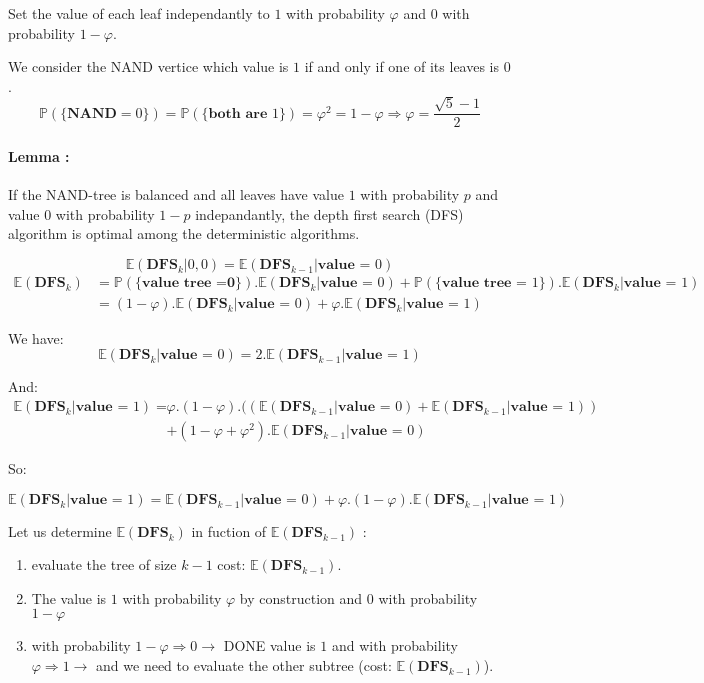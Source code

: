 Set the value of each leaf independantly to $1$ with probability $\varphi$ and $0$ with probability $1-\varphi$.

We consider the NAND vertice which value is $1$ if and only if one of its leaves is $0$.
$$\displaystyle{\mathbb{P}(\{\textbf{NAND}=0\}) = \mathbb{P}(\{\textbf{both are }1\}) = \varphi^{2}=1-\varphi \Rightarrow \varphi = \frac{\sqrt{5}-1}{2}}$$

\paragraph{Lemma :}
If the NAND-tree is balanced and all leaves have value $1$ with probability $p$ and value $0$ with probability $1-p$ indepandantly, the depth first search (DFS) algorithm is optimal among the deterministic algorithms.

$$\mathbb{E}(\textbf{DFS}_{k} | 0,0) = \mathbb{E}(\textbf{DFS}_{k-1}|\textbf{value = }0)$$
$$\begin{array}{cl}\mathbb{E}(\textbf{DFS}_{k}) &= \mathbb{P}(\{\textbf{value tree =0}\}).\mathbb{E}(\textbf{DFS}_{k} | \textbf{value = }0 )+ \mathbb{P}(\{\textbf{value tree = }1\}).\mathbb{E}(\textbf{DFS}_{k} | \textbf{value = }1 )\\
 
&=(1-\varphi).\mathbb{E}(\textbf{DFS}_{k} | \textbf{value = }0 )+ \varphi .\mathbb{E}(\textbf{DFS}_{k} | \textbf{value = }1 )
\end{array}$$


We have:
$$\mathbb{E}(\textbf{DFS}_{k} | \textbf{value = }0 )=2.\mathbb{E}(\textbf{DFS}_{k-1} | \textbf{value = }1 )$$

And:
$$\begin{array}{cl}\mathbb{E}(\textbf{DFS}_{k} | \textbf{value = }1 )=&\varphi.(1-\varphi).((\mathbb{E}(\textbf{DFS}_{k-1} | \textbf{value = }0 )+\mathbb{E}(\textbf{DFS}_{k-1} | \textbf{value = }1))\\
& +(1-\varphi+\varphi^{2}).\mathbb{E}(\textbf{DFS}_{k-1} | \textbf{value = }0)
\end{array}$$

So:

$$\mathbb{E}(\textbf{DFS}_{k} | \textbf{value = }1 )= \mathbb{E}(\textbf{DFS}_{k-1} | \textbf{value = }0)+\varphi.(1-\varphi).\mathbb{E}(\textbf{DFS}_{k-1} | \textbf{value = }1)$$

Let us determine $\mathbb{E}(\textbf{DFS}_{k})$ in fuction of $\mathbb{E}(\textbf{DFS}_{k-1})$ :

\begin{enumerate}
\item evaluate the tree of size $k-1$ cost: $\mathbb{E}(\textbf{DFS}_{k-1})$.
\item The value is $1$ with probability $\varphi$ by construction and 0 with probability $1-\varphi$
\item with probability $1-\varphi \Rightarrow 0 \rightarrow$ DONE value is $1$ and with probability $\varphi \Rightarrow 1 \rightarrow$ and we need to evaluate the other subtree (cost: $\mathbb{E}(\textbf{DFS}_{k-1})$).
\end{enumerate}

